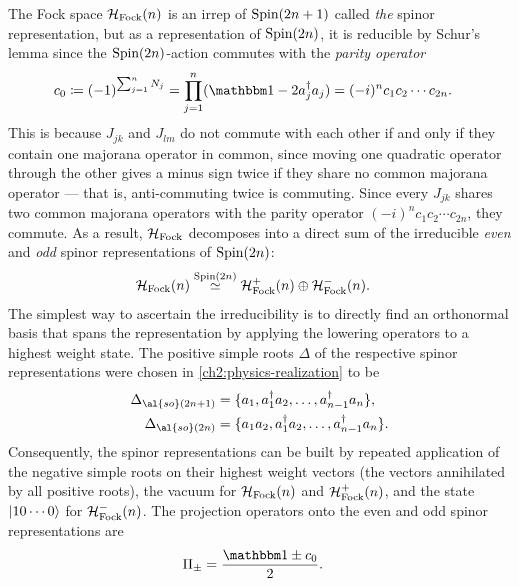 The Fock space $\mathcal{H}_{\text{Fock}}(n)$ is an irrep of $\text{Spin}(2n+1)$ called \emph{the} spinor representation, but as a representation of $\text{Spin}(2n)$, it is reducible by Schur's lemma since the $\text{Spin}(2n)$-action commutes with the \emph{parity operator}
\begin{align}\label{fermion-parity}
c_0 &\coloneqq (-1)^{\sum_{j=1}^n N_j} = \prod_{j=1}^n (\id - 2a\dgg_j a_j) = (-i)^n c_1 c_2 \cdots c_{2n}.
\end{align}
This is because $J_{jk}$ and $J_{lm}$ do not commute with each other if and only if they contain one majorana operator in common, since moving one quadratic operator through the other gives a minus sign twice if they share no common majorana operator --- that is, anti-commuting twice is commuting. Since every $J_{jk}$ shares two common majorana operators with the parity operator $(-i)^n c_1 c_2 \cdots c_{2n}$, they commute. As a result, $\mathcal{H}_{\text{Fock}}$ decomposes into a direct sum of the irreducible \emph{even} and \emph{odd} spinor representations of $\text{Spin}(2n)$:
\begin{align}
	\mathcal{H}_{\text{Fock}}(n) &\stackrel{\text{Spin}(2n)}{\simeq}
		\mathcal{H}^+_{\text{Fock}}(n) \oplus \mathcal{H}^-_{\text{Fock}}(n).
\end{align}
The simplest way to ascertain the irreducibility is to directly find an orthonormal basis that spans the representation by applying the lowering operators to a highest weight state.
The positive simple roots $\Delta$ of the respective spinor representations were chosen in \autoref{ch2:physics-realization} to be
\begin{align}
\Delta_{\al{so}(2n+1)} &= \{ a_1, a_1\dgg a_2, \dots, a_{n-1}\dgg a_n \}, \\
\Delta_{\al{so}(2n)} &= \{a_1a_2, a_1\dgg a_2, \dots, a_{n-1}\dgg a_n \}.
\end{align}
Consequently, the spinor representations can be built by repeated application of the negative simple roots on their highest weight vectors (the vectors annihilated by all positive roots), the vacuum for $\mathcal{H}_{\text{Fock}}(n)$ and $\mathcal{H}^+_{\text{Fock}}(n)$, and the state ${\left\vert{10\cdots0}\right\rangle}$ for $\mathcal{H}^-_{\text{Fock}}(n)$.
The projection operators onto the even and odd spinor representations are
\begin{align}
	\Pi_{\pm} &= \frac{\id \pm c_0}{2}.
\end{align}

